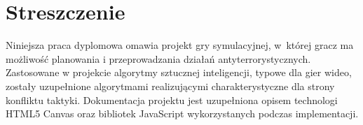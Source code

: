 \chapter*{Streszczenie}
Niniejsza praca dyplomowa omawia projekt gry symulacyjnej, w~której gracz ma możliwość planowania i przeprowadzania działań antyterrorystycznych. Zastosowane w projekcie algorytmy sztucznej inteligencji, typowe dla gier wideo, zostały uzupełnione algorytmami realizującymi charakterystyczne dla strony konfliktu taktyki. Dokumentacja projektu jest uzupełniona opisem technologi HTML5 Canvas oraz bibliotek JavaScript wykorzystanych podczas implementacji.
